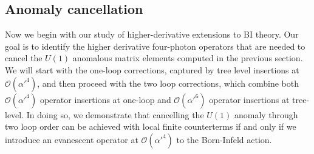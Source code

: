 \documentclass[11pt,letter]{article}
\begin{document}
\subsection{Anomaly cancellation}\label{sec:Anomalies}
Now we begin with our study of higher-derivative extensions to BI theory. Our goal is to identify the higher derivative four-photon operators that are needed to cancel the $U(1)$ anomalous matrix elements computed in the previous section. We will start with the one-loop corrections, captured by tree level insertions at $\mathcal{O}(\alpha'^4)$, and then proceed with the two loop corrections, which combine both $\mathcal{O}(\alpha'^4)$ operator insertions at one-loop and $\mathcal{O}(\alpha'^6)$ operator insertions at tree-level. In doing so, we demonstrate that cancelling the $U(1)$ anomaly through two loop order can be achieved with local finite counterterms if and only if we introduce an evanescent operator at $\mathcal{O}(\alpha'^4)$ to the Born-Infeld action. 
\end{document}
